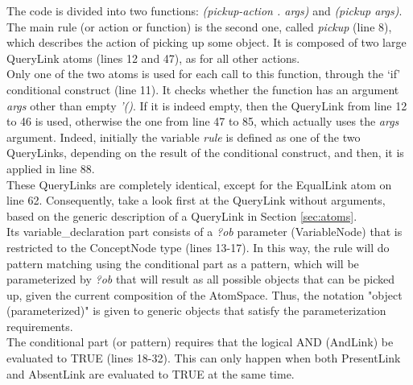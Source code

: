 The code is divided into two functions: \textit{(pickup-action . args)} and \textit{(pickup args)}. \\
The main rule (or action or function) is the second one, called \textit{pickup} (line 8), which describes the action of picking up some object.
It is composed of two large QueryLink atoms (lines 12 and 47), as for all other actions. \\
Only one of the two atoms is used for each call to this function, through the `if' conditional construct (line 11). It checks whether the function has an argument \textit{args} other than empty \textit{'()}. 
If it is indeed empty, then the QueryLink from line 12 to 46 is used, otherwise the one from line 47 to 85, which actually uses the \textit{args} argument.
Indeed, initially the variable \textit{rule} is defined as one of the two QueryLinks, depending on the result of the conditional construct, and then, it is applied in line 88. \\
These QueryLinks are completely identical, except for the EqualLink atom on line 62.
Consequently, take a look first at the QueryLink without arguments, based on the generic description of a QueryLink in Section \ref{sec:atoms}. \\

Its variable\_declaration part consists of a \textit{?ob} parameter (VariableNode) that is restricted to the ConceptNode type (lines 13-17). 
In this way, the rule will do pattern matching using the conditional part as a pattern, which will be parameterized by \textit{?ob} that will result as all possible objects that can be picked up, given the current composition of the AtomSpace. Thus, the notation "object (parameterized)" is given to generic objects that satisfy the parameterization requirements. \\

The conditional part (or pattern) requires that the logical AND (AndLink) be evaluated to TRUE (lines 18-32). This can only happen when both PresentLink and AbsentLink are evaluated to TRUE at the same time. 

